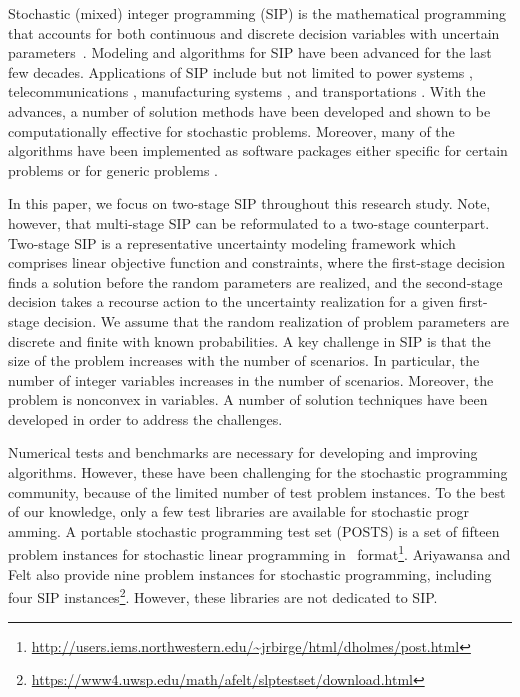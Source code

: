 Stochastic (mixed) integer programming (SIP) is the mathematical programming that accounts for 
both continuous and discrete decision variables with uncertain parameters~\cite{book:BL2011}. 
Modeling and algorithms for SIP have been advanced for the last few decades. Applications of SIP include but not limited to power systems \cite{journal:PO2013,journal:KYZC2017}, telecommunications \cite{journal:SDC1994}, manufacturing systems \cite{journal:SPR1994,journal:AG2004}, and transportations \cite{journal:MW1969,journal:PGM2017,journal:TPP2017,journal:MPT2014}. With the advances, a number of solution methods have been developed and shown to be computationally effective for stochastic problems. Moreover, many of the algorithms have been implemented as software packages either specific for certain problems or for generic problems \cite{SCIP,journal:WWH2012,journal:KZ2015}.

In this paper, we focus on two-stage SIP throughout this research study. Note, however, that multi-stage SIP can be reformulated to a two-stage counterpart. Two-stage SIP is a representative uncertainty modeling framework which comprises linear objective function and constraints, where the first-stage decision finds a solution before the 
random parameters are realized, and the second-stage decision takes a recourse action to the uncertainty realization for a given first-stage decision. We assume that the random realization of problem parameters are discrete and finite with known probabilities.
A key challenge in SIP is that the size of
the problem increases with the number of scenarios. In particular, the number of integer variables increases in the number of scenarios. Moreover, the problem is nonconvex in variables. A number of solution techniques have been developed in order to address the challenges.

Numerical tests and benchmarks are necessary for developing and improving algorithms. However,
these have been challenging for the stochastic programming community, because of the limited number of test problem instances. To the best of our knowledge, only a few test libraries are available for stochastic progr amming. A portable stochastic programming test set (POSTS) \cite{POSTS} is a set of fifteen problem instances for 
stochastic linear programming in \smps\ format\footnote{\url{http://users.iems.northwestern.edu/~jrbirge/html/dholmes/post.html}}. Ariyawansa and Felt \cite{journal:AF2004} also provide nine problem instances for stochastic programming, including four SIP instances\footnote{\url{https://www4.uwsp.edu/math/afelt/slptestset/download.html}}. However, these libraries are not dedicated to SIP. 


